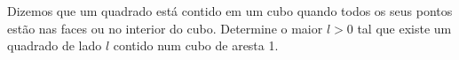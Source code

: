 Dizemos que um quadrado está contido em um cubo quando todos os seus pontos estão nas faces ou no interior do cubo. Determine o maior $l>0$ tal que existe um quadrado de lado $l$ contido num cubo de aresta 1.